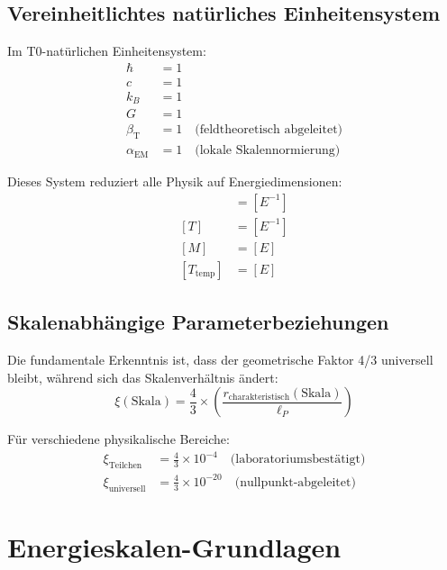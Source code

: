 \documentclass[12pt,a4paper]{article}
\newcommand{\betaT}{\beta_{\text{T}}}
\newcommand{\alphaEM}{\alpha_{\text{EM}}}
\begin{document}
	\subsection{Vereinheitlichtes nat\"urliches Einheitensystem}
	\label{subsec:unified_framework}
	
	Im T0-nat\"urlichen Einheitensystem:
	\begin{align}
		\hbar &= 1 \\
		c &= 1 \\
		k_B &= 1 \\
		G &= 1 \\
		\betaT &= 1 \quad \text{(feldtheoretisch abgeleitet)} \\
		\alphaEM &= 1 \quad \text{(lokale Skalennormierung)}
	\end{align}
	
	Dieses System reduziert alle Physik auf Energiedimensionen:
	\begin{align}
		[L] &= [E^{-1}] \\
		[T] &= [E^{-1}] \\
		[M] &= [E] \\
		[T_{\text{temp}}] &= [E]
	\end{align}
	
	\subsection{Skalenabh\"angige Parameterbeziehungen}
	\label{subsec:scale_dependent}
	
	Die fundamentale Erkenntnis ist, dass der geometrische Faktor 4/3 universell bleibt, w\"ahrend sich das Skalenverh\"altnis \"andert:
	\begin{equation}
		\xi(\text{Skala}) = \frac{4}{3} \times \left(\frac{r_{\text{charakteristisch}}(\text{Skala})}{\ell_P}\right)
	\end{equation}
	
	F\"ur verschiedene physikalische Bereiche:
	\begin{align}
		\xi_{\text{Teilchen}} &= \frac{4}{3} \times 10^{-4} \quad \text{(laboratoriumsbest\"atigt)} \\
		\xi_{\text{universell}} &= \frac{4}{3} \times 10^{-20} \quad \text{(nullpunkt-abgeleitet)}
	\end{align}
	
	\section{Energieskalen-Grundlagen}
	\label{sec:energy_foundations}
	
\end{document}
